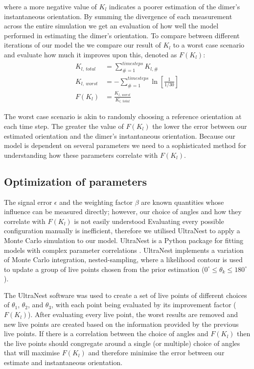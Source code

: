 \documentclass[final, 3p]{elsarticle}
\begin{document}
where a more negative value of $K_l$ indicates a poorer estimation of
the dimer's instantaneous orientation.  By summing the divergence of
each measurement across the entire simulation we get an evaluation of
how well the model performed in estimating the dimer's orientation.
To compare between different iterations of our model the we compare
our result of $K_l$ to a worst case scenario and evaluate how much it
improves upon this, denoted as $F(K_l)$:
\begin{align}
K_{l, \ total} &= \sum\limits_{\# =1}^{timesteps} K_{l,\#} \\
K_{l, \ worst} &= -\sum\limits_{\#=1}^{timesteps} \ln \left[\frac{1}{1/30} \right] \\
F(K_l) &= \frac{K_{l,\ worst}}{K_{l, \ total}}
\end{align}

The worst case scenario is akin to randomly choosing a reference
orientation at each time step. The greater the value of $F(K_l)$ the
lower the error between our estimated orientation and the dimer's
instantaneous orientation. Because our model is dependent on several
parameters we need to a sophisticated method for understanding how
these parameters correlate with $F(K_l)$.


\subsection{Optimization of parameters}
\label{sec:ultranest}

The signal error $\epsilon$ and the weighting factor $\beta$ are known
quantities whose influence can be measured directly; however, our
choice of angles and how they correlate with $F(K_l)$ is not easily
understood Evaluating every possible configuration manually is
inefficient, therefore we utilised UltraNest to apply a Monte Carlo
simulation to our model.  UltraNest is a Python package for fitting
models with complex parameter correlations
\cite{Buchner2016Ultranest}.  UltraNest implements a variation of
Monte Carlo integration, nested-sampling, where a likelihood contour
is used to update a group of live points chosen from the prior
estimation ($0^{\circ} \leq \theta_k \leq 180^{\circ}$).

The UltraNest software was used to create a set of live points of
different choices of $\theta_1$, $\theta_2$, and $\theta_3$, with each
point being evaluated by its improvement factor ($F(K_l)$).  After
evaluating every live point, the worst results are removed and new
live points are created based on the information provided by the
previous live points.  If there is a correlation between the choice of
angles and $F(K_l)$ then the live points should congregate around a
single (or multiple) choice of angles that will maximise $F(K_l)$ and
therefore minimise the error between our estimate and instantaneous
orientation.
\end{document}
